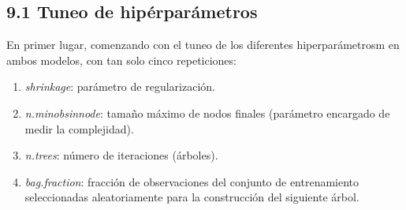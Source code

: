 \documentclass[
]{article}
\providecommand{\tightlist}{%
  \setlength{\itemsep}{0pt}\setlength{\parskip}{0pt}}
\begin{document}
\hypertarget{tuneo-de-hipuxe9rparuxe1metros}{%
\subsection{9.1 Tuneo de
hipérparámetros}\label{tuneo-de-hipuxe9rparuxe1metros}}

En primer lugar, comenzando con el tuneo de los diferentes
hiperparámetrosm en ambos modelos, con tan solo cinco repeticiones:

\begin{enumerate}
\def\labelenumi{\arabic{enumi}.}
\tightlist
\item
  \emph{shrinkage}: parámetro de regularización.
\item
  \emph{n.minobsinnode}: tamaño máximo de nodos finales (parámetro
  encargado de medir la complejidad).
\item
  \emph{n.trees}: número de iteraciones (árboles).
\item
  \emph{bag.fraction}: fracción de observaciones del conjunto de
  entrenamiento seleccionadas aleatoriamente para la construcción del
  siguiente árbol.
\end{enumerate}
\end{document}
